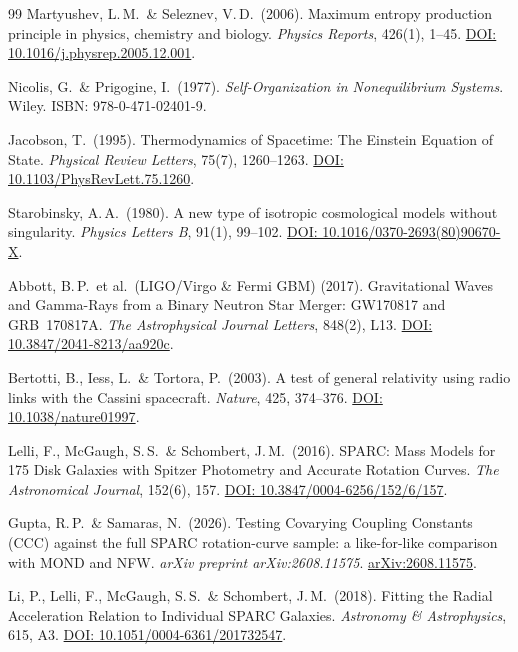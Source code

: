 \documentclass[aps,prd,twocolumn,superscriptaddress,nofootinbib]{revtex4-2}
\begin{document}
\begin{thebibliography}{99}
Martyushev, L.\,M.\ \& Seleznev, V.\,D.\ (2006).
Maximum entropy production principle in physics, chemistry and biology.
\textit{Physics Reports}, 426(1), 1--45.
\href{https://doi.org/10.1016/j.physrep.2005.12.001}{DOI: 10.1016/j.physrep.2005.12.001}.

Nicolis, G.\ \& Prigogine, I.\ (1977).
\textit{Self-Organization in Nonequilibrium Systems}. Wiley. ISBN: 978-0-471-02401-9.

Jacobson, T.\ (1995).
Thermodynamics of Spacetime: The Einstein Equation of State.
\textit{Physical Review Letters}, 75(7), 1260--1263.
\href{https://doi.org/10.1103/PhysRevLett.75.1260}{DOI: 10.1103/PhysRevLett.75.1260}.

Starobinsky, A.\,A.\ (1980).
A new type of isotropic cosmological models without singularity.
\textit{Physics Letters B}, 91(1), 99--102.
\href{https://doi.org/10.1016/0370-2693(80)90670-X}{DOI: 10.1016/0370-2693(80)90670-X}.

Abbott, B.\,P.\ et al.\ (LIGO/Virgo \& Fermi GBM) (2017).
Gravitational Waves and Gamma-Rays from a Binary Neutron Star Merger: GW170817 and GRB~170817A.
\textit{The Astrophysical Journal Letters}, 848(2), L13.
\href{https://doi.org/10.3847/2041-8213/aa920c}{DOI: 10.3847/2041-8213/aa920c}.

Bertotti, B., Iess, L.\ \& Tortora, P.\ (2003).
A test of general relativity using radio links with the Cassini spacecraft.
\textit{Nature}, 425, 374--376.
\href{https://doi.org/10.1038/nature01997}{DOI: 10.1038/nature01997}.

Lelli, F., McGaugh, S.\,S.\ \& Schombert, J.\,M.\ (2016).
SPARC: Mass Models for 175 Disk Galaxies with Spitzer Photometry and Accurate Rotation Curves.
\textit{The Astronomical Journal}, 152(6), 157.
\href{https://doi.org/10.3847/0004-6256/152/6/157}{DOI: 10.3847/0004-6256/152/6/157}.

Gupta, R.\,P.\ \& Samaras, N.\ (2026).
Testing Covarying Coupling Constants (CCC) against the full SPARC rotation-curve sample: a like-for-like comparison with MOND and NFW.
\textit{arXiv preprint arXiv:2608.11575}.
\href{https://arxiv.org/abs/2608.11575}{arXiv:2608.11575}.

Li, P., Lelli, F., McGaugh, S.\,S.\ \& Schombert, J.\,M.\ (2018).
Fitting the Radial Acceleration Relation to Individual SPARC Galaxies.
\textit{Astronomy \& Astrophysics}, 615, A3.
\href{https://doi.org/10.1051/0004-6361/201732547}{DOI: 10.1051/0004-6361/201732547}.


\end{thebibliography}
\end{document}

